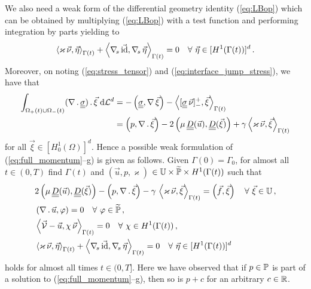 We also need a weak form of the differential geometry identity
(\ref{eq:LBop}) which can be obtained by multiplying (\ref{eq:LBop}) with a
test function and performing integration by parts yielding to
$$
\left\langle \varkappa\,\vec\nu, \vec\eta \right\rangle_{\Gamma(t)}
+ \left\langle \nabla_{\!s}\,\vec {\rm id}, \nabla_{\!s}\,\vec \eta \right\rangle_{\Gamma(t)}
= 0  \quad \forall\ \vec\eta \in [H^1(\Gamma(t))]^d\,.
$$
Moreover, on noting (\ref{eq:stress_tensor}) and
(\ref{eq:interface_jump_stress}), we have that
\begin{align*}
\int_{\Omega_+(t)\cup\Omega_-(t)} (\nabla\,.\,\mat\sigma)\,.\, \vec \xi \dL{d}
& = - \left(\mat\sigma, \nabla\,\vec \xi\right)
- \left\langle [\mat\sigma\,\vec\nu]_-^+ , \vec \xi
  \right\rangle_{\Gamma(t)} \nonumber \\
& = \left( p , \nabla\,.\,\vec \xi\right)
-2 \left(\mu\,\mat D(\vec u) , \mat D(\vec \xi) \right)
+ \gamma \left\langle \varkappa\,\vec \nu , \vec \xi  \right\rangle_{\Gamma(t)}
\end{align*}
for all $\vec \xi \in [H^1_0(\Omega)]^d$. Hence a possible weak formulation of
(\ref{eq:full_momentum}--g) is given as follows. Given $\Gamma(0) = \Gamma_0$,
for almost all $t\in(0,T)$ find $\Gamma(t)$ and ${(\vec u, p, \varkappa)}$ ${\in
\mathbb{U} \times \widetilde{\mathbb{P}} \times H^1(\Gamma(t))}$ such that
\begin{subequations}
\begin{align}
& 2\left(\mu\,\mat D(\vec u), \mat D(\vec \xi)\right)
- \left(p, \nabla\,.\,\vec \xi\right)
- \gamma\,\left\langle \varkappa\,\vec\nu, \vec\xi\right\rangle_{\Gamma(t)}
= \left(\vec f, \vec \xi\right)\quad \forall\ \vec\xi \in \uspace \,,
\label{eq:weaka}\\
& \left(\nabla\,.\,\vec u, \varphi\right) = 0
\quad \forall\ \varphi \in \pnormspace\,, \label{eq:weakb} \\
&  \left\langle \V
- \vec u, \chi\,\vec\nu \right\rangle_{\Gamma(t)} = 0
\quad \forall\ \chi \in H^1(\Gamma(t))\,, \label{eq:weakc} \\
& \left\langle \varkappa\,\vec\nu, \vec\eta \right\rangle_{\Gamma(t)}
+ \left\langle \nabs\,\vec \id, \nabs\,\vec \eta \right\rangle_{\Gamma(t)}
= 0  \quad \forall\ \vec\eta \in [H^1(\Gamma(t))]^d\,\label{eq:weakd}
\end{align}
\end{subequations}
holds for almost all times $t \in (0,T]$. Here we have observed that if
$p \in \mathbb{P}$ is part of a solution to (\ref{eq:full_momentum}--g), then so is
$p + c$ for an arbitrary $c\in {\mathbb R}$.

